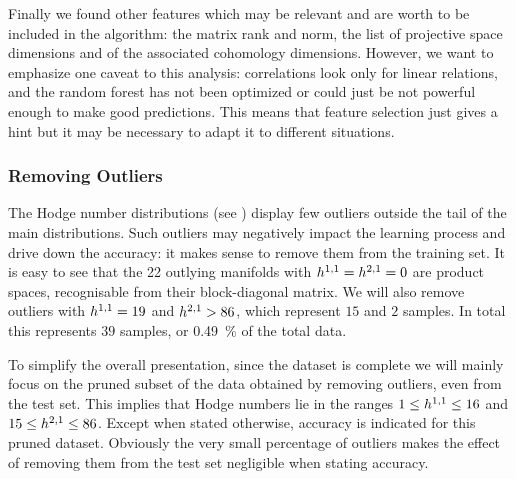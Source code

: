 Finally we found other features which may be relevant and are worth to be included in the algorithm: the matrix rank and norm, the list of projective space dimensions and of the associated cohomology dimensions.
However, we want to emphasize one caveat to this analysis: correlations look only for linear relations, and the random forest has not been optimized or could just be not powerful enough to make good predictions.
This means that feature selection just gives a hint but it may be necessary to adapt it to different situations.


\subsubsection{Removing Outliers}
\label{sec:data:eda:outliers}

The Hodge number distributions (see ) display few outliers outside the tail of the main distributions.
Such outliers may negatively impact the learning process and drive down the accuracy: it makes sense to remove them from the training set.
It is easy to see that the \num{22} outlying manifolds with $h^{1,1} = h^{2,1} = 0$ are product spaces, recognisable from their block-diagonal matrix.
We will also remove outliers with $h^{1,1} = 19$ and $h^{2,1} > 86$, which represent $15$ and $2$ samples.
In total this represents $39$ samples, or \SI{0.49}{\percent} of the total data.

To simplify the overall presentation, since the dataset is complete we will mainly focus on the pruned subset of the data obtained by removing outliers, even from the test set.\footnotemark{}
This implies that Hodge numbers lie in the ranges $1 \le h^{1,1} \le 16$ and $15 \le h^{2,1} \le 86$.
Except when stated otherwise, accuracy is indicated for this pruned dataset.
Obviously the very small percentage of outliers makes the effect of removing them from the test set negligible when stating accuracy.

